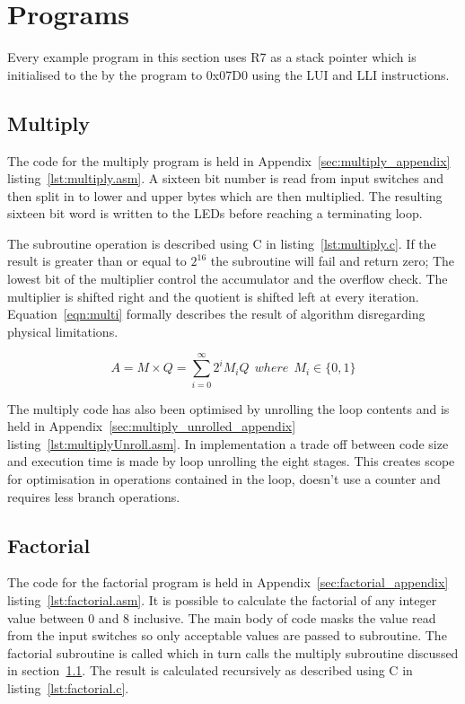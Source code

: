 

\section{Programs}
Every example program in this section uses R7 as a stack pointer which is initialised to the by the program to 0x07D0 using the LUI and LLI instructions.





\subsection{Multiply}
\label{sec:multiply}
The code for the multiply program is held in Appendix~\ref{sec:multiply_appendix} listing~\ref{lst:multiply.asm}.
A sixteen bit number is read from input switches and then split in to lower and upper bytes which are then multiplied.
The resulting sixteen bit word is written to the LEDs before reaching a terminating loop.

The subroutine operation is described using C in listing~\ref{lst:multiply.c}. 
If the result is greater than or equal to $2^{16}$ the subroutine will fail and return zero;
The lowest bit of the multiplier control the accumulator and the overflow check.
The multiplier is shifted right and the quotient is shifted left at every iteration.
Equation~\eqref{eqn:multi} formally describes the result of algorithm disregarding physical limitations.



\begin{equation}
   A = M \times Q = \sum_{i=0}^{\infty} 2^i M_i Q\:\:where\:\:M_i \in \{0,1\}
   \label{eqn:multi}
\end{equation}

The multiply code has also been optimised by unrolling the loop contents and is held in Appendix~\ref{sec:multiply_unrolled_appendix} listing~\ref{lst:multiplyUnroll.asm}.
In implementation a trade off between code size and execution time is made by loop unrolling the eight stages.
This creates scope for optimisation in operations contained in the loop, doesn't use a counter and requires less branch operations.





\subsection{Factorial}
\label{sec:factorial}
The code for the factorial program is held in Appendix~\ref{sec:factorial_appendix} listing~\ref{lst:factorial.asm}.
It is possible to calculate the factorial of any integer value between $0$ and $8$ inclusive.
The main body of code masks the value read from the input switches so only acceptable values are passed to subroutine.
The factorial subroutine is called which in turn calls the multiply subroutine discussed in section~\ref{sec:multiply}. 
The result is calculated recursively as described using C in listing~\ref{lst:factorial.c}. 


